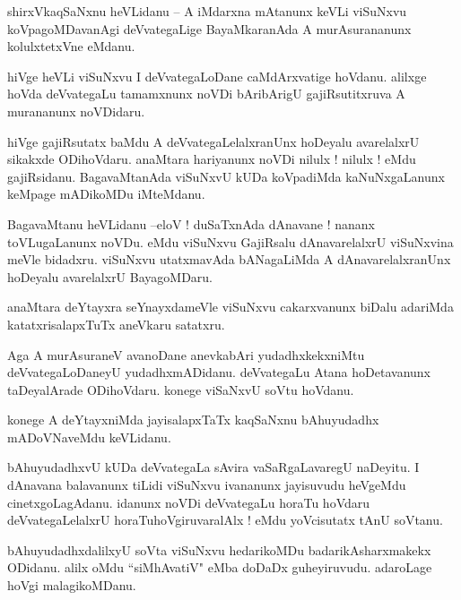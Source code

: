 \documentclass{article}
\begin{document}
\begin{mn}%
shirxVkaqSaNxnu heVLidanu -- A iMdarxna mAtanunx keVLi viSuNxvu koVpagoMDavanAgi deVvategaLige 
BayaMkaranAda A murAsurananunx kolulxtetxVne eMdanu.
\end{mn}

\begin{mn}%
hiVge heVLi viSuNxvu I deVvategaLoDane caMdArxvatige hoVdanu. alilxge hoVda deVvategaLu tamamxnunx 
noVDi bAribArigU gajiRsutitxruva A murananunx noVDidaru.
\end{mn}

\begin{mn}%
hiVge gajiRsutatx baMdu A deVvategaLelalxranUnx hoDeyalu avarelalxrU sikakxde ODihoVdaru. anaMtara 
hariyanunx noVDi nilulx ! nilulx ! eMdu gajiRsidanu. BagavaMtanAda viSuNxvU kUDa koVpadiMda 
kaNuNxgaLanunx keMpage mADikoMDu iMteMdanu.
\end{mn}

\begin{mn}%
BagavaMtanu heVLidanu --eloV ! duSaTxnAda dAnavane ! nananx toVLugaLanunx noVDu. eMdu viSuNxvu 
GajiRsalu dAnavarelalxrU viSuNxvina meVle bidadxru. viSuNxvu utatxmavAda bANagaLiMda A 
dAnavarelalxranUnx hoDeyalu avarelalxrU BayagoMDaru.
\end{mn}

\begin{mn}%
anaMtara deYtayxra seYnayxdameVle viSuNxvu cakarxvanunx biDalu adariMda katatxrisalapxTuTx aneVkaru 
satatxru.
\end{mn}

\begin{mn}%
Aga A murAsuraneV avanoDane anevkabAri yudadhxkekxniMtu deVvategaLoDaneyU yudadhxmADidanu. 
deVvategaLu Atana hoDetavanunx taDeyalArade ODihoVdaru. konege viSaNxvU soVtu hoVdanu.
\end{mn}

\begin{mn}%
konege A deYtayxniMda jayisalapxTaTx kaqSaNxnu bAhuyudadhx mADoVNaveMdu keVLidanu.
\end{mn}

\begin{mn}%
bAhuyudadhxvU kUDa deVvategaLa sAvira vaSaRgaLavaregU naDeyitu. I dAnavana balavanunx tiLidi 
viSuNxvu ivananunx jayisuvudu heVgeMdu cinetxgoLagAdanu. idanunx noVDi deVvategaLu horaTu hoVdaru 
deVvategaLelalxrU horaTuhoVgiruvaralAlx ! eMdu yoVcisutatx tAnU soVtanu.
\end{mn}

\begin{mn}%
bAhuyudadhxdalilxyU soVta viSuNxvu hedarikoMDu badarikAsharxmakekx ODidanu. alilx oMdu ``siMhAvatiV" eMba doDaDx guheyiruvudu. adaroLage hoVgi malagikoMDanu.
\end{mn}
\end{document}
